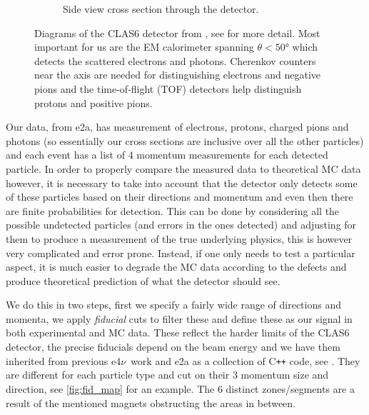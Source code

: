 \documentclass[a4paper,12pt]{article}
\newcommand{\efn}{e4$\nu$}
\begin{document}
\begin{figure}[H]
\begin{subfigure}[b]{0.5\textwidth}
        \caption{Side view cross section through the detector.}
    \end{subfigure}
    \caption{\label{fig:CLAS}
        Diagrams of the CLAS6 detector from \cite{meckingCEBAFLargeAcceptance2003}, see for more detail.
        Most important for us are the EM calorimeter spanning $\theta < 50\si{\degree}$ which detects the scattered electrons and photons.
        Cherenkov counters near the axis are needed for distinguishing electrons and negative pions and the time-of-flight (TOF) detectors help distinguish protons and positive pions.
    }
\end{figure}

Our data, from e2a, has measurement of electrons, protons, charged pions and photons (so essentially our cross sections are inclusive over all the other particles) and each event has a list of 4 momentum measurements for each detected particle.
In order to properly compare the measured data to theoretical MC data however, it is necessary to take into account that the detector only detects some of these particles based on their directions and momentum and even then there are finite probabilities for detection.
This can be done by considering all the possible undetected particles (and errors in the ones detected) and adjusting for them to produce a measurement of the true underlying physics, this is however very complicated and error prone.
Instead, if one only needs to test a particular aspect, it is much easier to degrade the MC data according to the defects and produce theoretical prediction of what the detector should see.

We do this in two steps, first we specify a fairly wide range of directions and momenta, we apply \emph{fiducial} cuts to filter these and define these as our signal in both experimental and MC data.
These reflect the harder limits of the CLAS6 detector, the precise fiducials depend on the beam energy and we have them inherited from previous \efn\ work and e2a as a collection of C\texttt{++} code, see \cite{papadopoulouLeptonNucleusScatteringMeasurements2023,mclauchlanDeltaElectroproduction12C}.
They are different for each particle type and cut on their 3 momentum size and direction, see \cref{fig:fid_map} for an example.
The 6 distinct zones/segments are a result of the mentioned magnets obstructing the areas in between.
\end{document}
